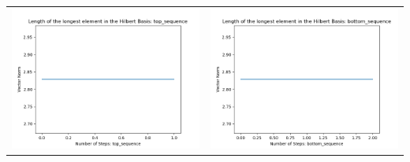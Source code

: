 \documentclass[10pt]{article}
\begin{document}
\begin{tabular}{c|c}
\begin{minipage}{.45\textwidth}
\includegraphics[width=\textwidth]{"DATA/5d/6 generators 1 bound A/top_sequence LENGTH"}
\end{minipage} &
\begin{minipage}{.45\textwidth}
\includegraphics[width=\textwidth]{"DATA/5d/6 generators 1 bound A bottomup/bottom_sequence LENGTH"}
\end{minipage}
\end{tabular}
\end{document}
